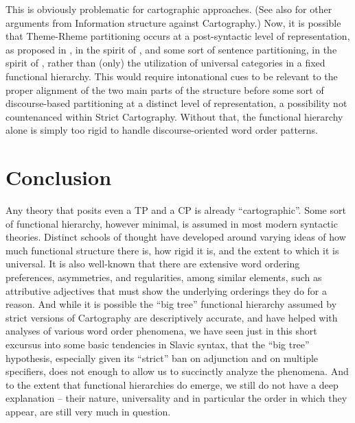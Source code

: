 \documentclass[output=paper]{langscibook}
\begin{document}
This is obviously problematic for cartographic approaches. (See also \citealt{wagner2009focus} for other arguments from Information structure against Cartography.) Now, it is possible that Theme-Rheme partitioning occurs at a post-syntactic level of representation, as proposed in \citealt{Bailyn2012}, in the spirit of \citet{Zubizaretta1998}, and some sort of sentence partitioning, in the spirit of \citealt{Diesing1992}, rather than (only) the utilization of universal categories in a fixed functional hierarchy. This would require intonational cues to be relevant to the proper alignment of the two main parts of the structure before some sort of discourse-based partitioning at a distinct level of representation, a possibility not countenanced within Strict Cartography. Without that, the functional hierarchy alone is simply too rigid to handle discourse-oriented word order patterns.

\section{Conclusion}

Any theory that posits even a TP and a CP is already “cartographic”.  Some sort of functional hierarchy, however minimal, is assumed in most modern syntactic theories. Distinct schools of thought have developed around varying ideas of how much functional structure there is, how rigid it is, and the extent to which it is universal. It is also well-known that there are extensive word ordering preferences, asymmetries, and regularities, among similar elements, such as attributive adjectives that must show the underlying orderings they do for a reason. And while it is possible the “big tree” functional hierarchy assumed by strict versions of Cartography are descriptively accurate, and have helped with analyses of various word order phenomena, we have seen just in this short excursus into some basic tendencies in Slavic syntax, that the “big tree” hypothesis, especially given its “strict” ban on adjunction and on multiple specifiers,  does not enough to allow us to succinctly analyze the phenomena.  And to the extent that functional hierarchies do emerge, we still do not have a deep explanation – their nature, universality and in particular the order in which they appear, are still very much in question.   
\end{document}
